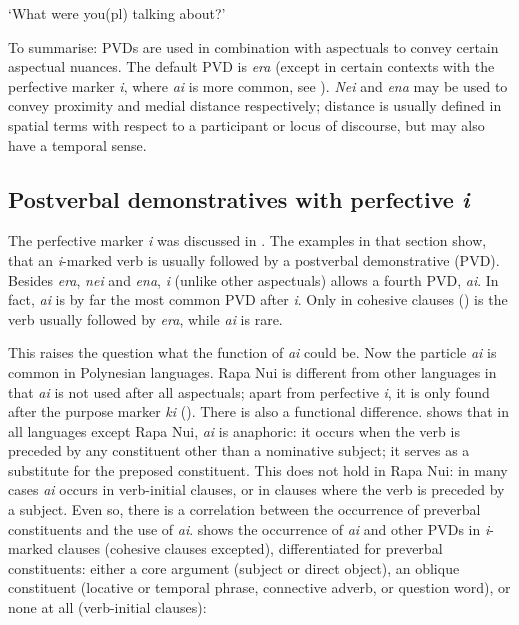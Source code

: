\glt 
‘What were you(pl) talking about?’ \textstyleExampleref{[Ley-2-02.062]}
\z

To summarise: PVDs are used in combination with aspectuals to convey certain aspectual nuances. The default PVD is \textit{era} (except in certain contexts with the perfective marker \textit{i}, where \textit{ai} is more common, see ). \textit{Nei} and \textit{ena} may be used to convey proximity and medial distance respectively; distance is usually defined in spatial terms with respect to a participant or locus of discourse, but may also have a temporal sense.
\subsection{Postverbal demonstratives with perfective \textit{i}}\label{sec:7.6.5}

The perfective marker \textit{i} was discussed in . The examples in that section show, that an \textit{i}{}-marked verb is usually followed by a postverbal demonstrative (PVD). Besides \textit{era}, \textit{nei} and \textit{ena}, \textit{i} (unlike other aspectuals) allows a fourth PVD, \textit{ai}. In fact, \textit{ai} is by far the most common PVD after \textit{i}. Only in cohesive clauses () is the verb usually followed by \textit{era}, while \textit{ai} is rare.

This raises the question what the function of \textit{ai} could be. Now the particle \textit{ai} is common in Polynesian languages. Rapa Nui is different from other languages in that \textit{ai} is not used after all aspectuals; apart from perfective \textit{i}, it is only found after the purpose marker \textit{ki} (). There is also a functional difference. \citet{Chapin1974} shows that in all languages except Rapa Nui, \textit{ai} is anaphoric: it occurs when the verb is preceded by any constituent other than a nominative subject; it serves as a substitute for the preposed constituent. This does not hold in Rapa Nui: in many cases \textit{ai} occurs in verb-initial clauses, or in clauses where the verb is preceded by a subject. Even so, there is a correlation between the occurrence of preverbal constituents and the use of \textit{ai}.  shows the occurrence of \textit{ai} and other PVDs in \textit{i}{}-marked clauses (cohesive clauses excepted), differentiated for preverbal constituents: either a core argument (subject or direct object), an oblique constituent (locative or temporal phrase, connective adverb, or question word), or none at all (verb-initial clauses): 

